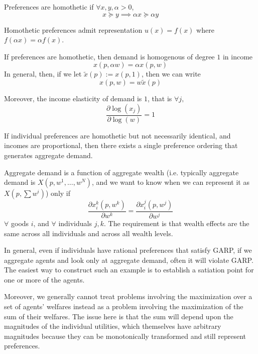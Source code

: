 \begin{definition}
  Preferences are homothetic if $\forall x, y, \alpha > 0$,
  \[
  x \succeq y \implies \alpha x \succeq \alpha y
  \]
\end{definition}

\begin{prop}
  Homothetic preferences admit representation $u(x) = f(x)$ where
  $f(\alpha x) = \alpha f(x)$.
\end{prop}

\begin{prop}
  If preferences are homothetic, then demand is homogenous of degree
  $1$ in income
  \[
  x(p, \alpha w) = \alpha x(p,w)
  \]
  In general, then, if we let $\tilde x(p) := x(p, 1)$, then we can
  write
  \[
  x(p,w) = w \tilde x(p)
  \]

  Moreover, the income elasticity of demand is $1$, that is $\forall j,$
  \[
  \frac{\partial \log(x_j)}{\partial \log(w)} = 1
  \]
\end{prop}

\begin{theorem}[Chipman 1974]
  If individual preferences are homothetic but not necessarily
  identical, and incomes are proportional, then there exists a single
  preference ordering that generates aggregate demand.
\end{theorem}

\begin{prop}
  Aggregate demand is a function of aggregate wealth (i.e. typically
  aggregate demand is $X(p, w^1, \dots, w^N)$, and we want to know
  when we can represent it as $X(p, \sum w^i)$) only if 
  \[
  \frac{\partial x^k_i(p, w^k)}{\partial w^k}
  = \frac{\partial x^j_i(p, w^j)}{\partial w^j}
  \]
  $\forall$ goods $i$, and $\forall$ individuals $j,k$. The
  requirement is that wealth effects are the same across all
  individuals and across all wealth levels.
\end{prop}


In general, even if individuals have rational preferences that satisfy
GARP, if we aggregate agents and look only at aggregate demand, often
it will violate GARP. The easiest way to construct such an example is
to establish a satiation point for one or more of the agents.

Moreover, we generally cannot treat problems involving the
maximization over a set of agents' welfares instead as a problem
involving the maximization of the sum of their welfares. The issue
here is that the sum will depend upon the magnitudes of the individual
utilities, which themselves have arbitrary magnitudes because they can
be monotonically transformed and still represent preferences.

